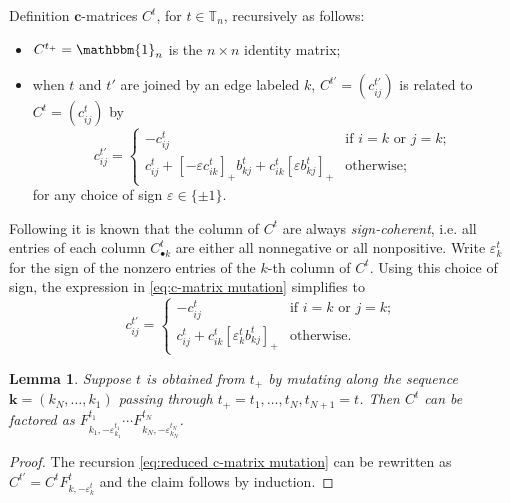 \documentclass{amsart}
\newtheorem{lemma}[theorem]{Lemma}
\numberwithin{theorem}{section}
\newcommand{\bfc}{\boldsymbol{c}}
\newcommand{\bfk}{{\boldsymbol{k}}}
\newcommand{\TT}{\mathbb{T}}
\newcommand{\bOne}{\mathbbm{1}}
\begin{document}
  Definition $\bfc$-matrices $C^t$, for $t\in\TT_n$, recursively as follows:
  \begin{itemize}
    \item $C^{t_+} = \bOne_n$ is the $n\times n$ identity matrix;
    \item when $t$ and $t'$ are joined by an edge labeled $k$, $C^{t'}=(c^{t'}_{ij})$ is related to $C^t=(c^t_{ij})$ by
      \begin{equation}
        \label{eq:c-matrix mutation}
        c^{t'}_{ij} = \begin{cases} -c^t_{ij} & \text{if $i=k$ or $j=k$;}\\ c^t_{ij} + [-\varepsilon c^t_{ik}]_+ b^t_{kj} + c^t_{ik} [\varepsilon b^t_{kj}]_+ & \text{otherwise;} \end{cases}
      \end{equation}
      for any choice of sign $\varepsilon\in\{\pm1\}$.
  \end{itemize}

  Following \cite{keller,ghkk} it is known that the column of $C^t$ are always \emph{sign-coherent}, i.e. all entries of each column $C^t_{\bullet k}$ are either all nonnegative or all nonpositive.
  Write $\varepsilon^t_k$ for the sign of the nonzero entries of the $k$-th column of $C^t$.
  Using this choice of sign, the expression in \eqref{eq:c-matrix mutation} simplifies to
  \begin{equation}
    \label{eq:reduced c-matrix mutation}
    c^{t'}_{ij} = \begin{cases} -c^t_{ij} & \text{if $i=k$ or $j=k$;}\\ c^t_{ij} + c^t_{ik} [\varepsilon^t_k b^t_{kj}]_+ & \text{otherwise.} \end{cases}
  \end{equation}

  \begin{lemma}
    \label{le:c-matrix factorization}
    Suppose $t$ is obtained from $t_+$ by mutating along the sequence $\bfk=(k_N,\ldots,k_1)$ passing through $t_+=t_1,\ldots,t_N,t_{N+1}=t$.
    Then $C^t$ can be factored as $F^{t_1}_{k_1,-\varepsilon^{t_1}_{k_1}}\cdots F^{t_N}_{k_N,-\varepsilon^{t_N}_{k_N}}$.
  \end{lemma}
  \begin{proof}
    The recursion \eqref{eq:reduced c-matrix mutation} can be rewritten as $C^{t'}=C^t F^t_{k,-\varepsilon^t_k}$ and the claim follows by induction.
  \end{proof}
\end{document}
